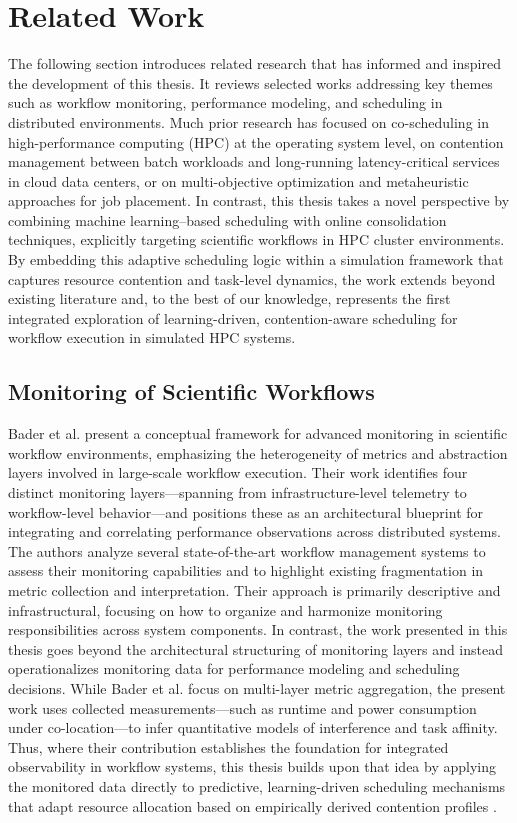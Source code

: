 \section{Related Work}
\label{cha:relatedwork}
The following section introduces related research that has informed and inspired the development of this thesis. It reviews selected works addressing key themes such as workflow monitoring, performance modeling, and scheduling in distributed environments. Much prior research has focused on co-scheduling in high-performance computing (HPC) at the operating system level, on contention management between batch workloads and long-running latency-critical services in cloud data centers, or on multi-objective optimization and metaheuristic approaches for job placement. In contrast, this thesis takes a novel perspective by combining machine learning–based scheduling with online consolidation techniques, explicitly targeting scientific workflows in HPC cluster environments. By embedding this adaptive scheduling logic within a simulation framework that captures resource contention and task-level dynamics, the work extends beyond existing literature and, to the best of our knowledge, represents the first integrated exploration of learning-driven, contention-aware scheduling for workflow execution in simulated HPC systems.

\subsection{Monitoring of Scientific Workflows}
\label{sec:relatedwork_monitoring_scientific_workflows}
Bader et al. present a conceptual framework for advanced monitoring in scientific workflow environments, emphasizing the heterogeneity of metrics and abstraction layers involved in large-scale workflow execution. Their work identifies four distinct monitoring layers—spanning from infrastructure-level telemetry to workflow-level behavior—and positions these as an architectural blueprint for integrating and correlating performance observations across distributed systems. The authors analyze several state-of-the-art workflow management systems to assess their monitoring capabilities and to highlight existing fragmentation in metric collection and interpretation. Their approach is primarily descriptive and infrastructural, focusing on how to organize and harmonize monitoring responsibilities across system components.
In contrast, the work presented in this thesis goes beyond the architectural structuring of monitoring layers and instead operationalizes monitoring data for performance modeling and scheduling decisions. While Bader et al. focus on multi-layer metric aggregation, the present work uses collected measurements—such as runtime and power consumption under co-location—to infer quantitative models of interference and task affinity. Thus, where their contribution establishes the foundation for integrated observability in workflow systems, this thesis builds upon that idea by applying the monitored data directly to predictive, learning-driven scheduling mechanisms that adapt resource allocation based on empirically derived contention profiles \cite{Bader_2022}.

